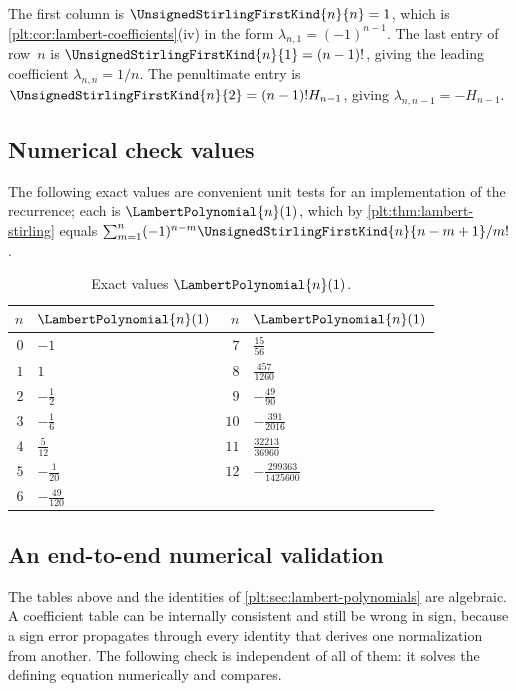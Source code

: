\documentclass[11pt,oneside]{article}
\theoremstyle{plain}
\theoremstyle{definition}
\theoremstyle{remark}
\newcommand{\stirlingone}[2]{\UnsignedStirlingFirstKind{#1}{#2}}
\newcommand{\LamP}[1]{\LambertPolynomial{#1}}
\begin{document}
The first column is \(\stirlingone{n}{n}=1\), which is
\cref{plt:cor:lambert-coefficients}(iv) in the form
\(\lambda_{n,1}=(-1)^{n-1}\).  The last entry of row~\(n\) is
\(\stirlingone{n}{1}=(n-1)!\), giving the leading coefficient
\(\lambda_{n,n}=1/n\).  The penultimate entry is
\(\stirlingone{n}{2}=(n-1)!H_{n-1}\), giving
\(\lambda_{n,n-1}=-H_{n-1}\).

\subsection{Numerical check values}

The following exact values are convenient unit tests for an
implementation of the recurrence; each is \(\LamP{n}(1)\), which by
\cref{plt:thm:lambert-stirling} equals
\(\sum_{m=1}^{n}(-1)^{n-m}\stirlingone{n}{n-m+1}/m!\).

\begin{table}[htbp]\centering\small
\caption{Exact values $\LamP{n}(1)$.}\label{plt:tab:lambert-at-one}
\begin{tabular}{@{}r l r l@{}}
\toprule
$n$ & $\LamP{n}(1)$ & $n$ & $\LamP{n}(1)$\\
\midrule
$0$ & $-1$ & $7$ & $\frac{15}{56}$\\
$1$ & $1$ & $8$ & $\frac{457}{1260}$\\
$2$ & $-\frac{1}{2}$ & $9$ & $-\frac{49}{90}$\\
$3$ & $-\frac{1}{6}$ & $10$ & $-\frac{391}{2016}$\\
$4$ & $\frac{5}{12}$ & $11$ & $\frac{32213}{36960}$\\
$5$ & $-\frac{1}{20}$ & $12$ & $-\frac{299363}{1425600}$\\
$6$ & $-\frac{49}{120}$ &  & \\
\bottomrule
\end{tabular}
\end{table}


\subsection{An end-to-end numerical validation}
\label{plt:sec:numeric-validation}

The tables above and the identities of \cref{plt:sec:lambert-polynomials} are
algebraic.  A coefficient table can be internally consistent and still be
wrong in sign, because a sign error propagates through every identity that
derives one normalization from another.  The following check is independent of
all of them: it solves the defining equation numerically and compares.
\end{document}
